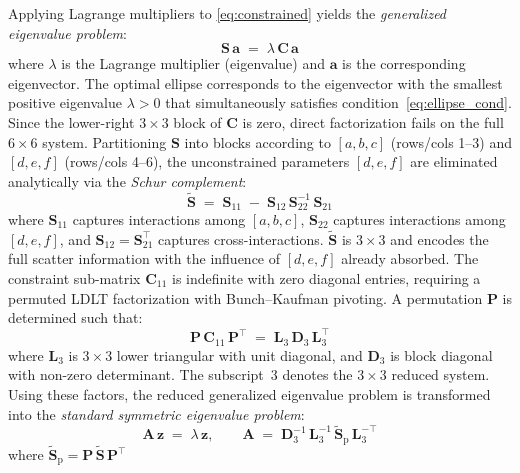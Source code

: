 \documentclass[colorlinks,upint,subscriptcorrection,varvw,hyphenate,balance,greek,russian,vietnamese,german]{asmeconf} %
\begin{document}
Applying Lagrange multipliers to \eqref{eq:constrained} yields
the \emph{generalized eigenvalue problem}:
\begin{equation}
	\mathbf{S}\,\mathbf{a} \;=\;
	\lambda\,\mathbf{C}\,\mathbf{a}
	\label{eq:gen_eig}
\end{equation}
where $\lambda$ is the Lagrange multiplier (eigenvalue) and
$\mathbf{a}$ is the corresponding eigenvector.
The optimal ellipse corresponds to the eigenvector
with the smallest positive eigenvalue $\lambda > 0$
that simultaneously satisfies condition~\eqref{eq:ellipse_cond}.
Since the lower-right $3\times3$ block of $\mathbf{C}$ is zero,
direct factorization fails on the full $6\times6$ system.
Partitioning $\mathbf{S}$ into blocks according to
$[a,b,c]$ (rows/cols 1--3) and $[d,e,f]$ (rows/cols 4--6),
the unconstrained parameters $[d,e,f]$ are eliminated
analytically via the \emph{Schur complement}:
\begin{equation}
	\widetilde{\mathbf{S}} \;=\;
	\mathbf{S}_{11}
	\;-\;
	\mathbf{S}_{12}\,\mathbf{S}_{22}^{-1}\,\mathbf{S}_{21}
	\label{eq:schur}
\end{equation}
where $\mathbf{S}_{11}$ captures interactions among $[a,b,c]$,
$\mathbf{S}_{22}$ captures interactions among $[d,e,f]$,
and $\mathbf{S}_{12}=\mathbf{S}_{21}^\top$ captures cross-interactions.
$\widetilde{\mathbf{S}}$ is $3\times3$ and encodes the full
scatter information with the influence of $[d,e,f]$ already absorbed.
The constraint sub-matrix $\mathbf{C}_{11}$ is indefinite with
zero diagonal entries, requiring a permuted LDLT factorization
with Bunch--Kaufman pivoting. A permutation $\mathbf{P}$
is determined such that:
\begin{equation}
	\mathbf{P}\,\mathbf{C}_{11}\,\mathbf{P}^\top
	\;=\; \mathbf{L}_3\,\mathbf{D}_3\,\mathbf{L}_3^\top
	\label{eq:ldlt}
\end{equation}
where $\mathbf{L}_3$ is $3\times3$ lower triangular with unit diagonal,
and $\mathbf{D}_3$ is block diagonal with non-zero determinant.
The subscript~3 denotes the $3\times3$ reduced system.
Using these factors, the reduced generalized eigenvalue problem is
transformed into the \emph{standard symmetric eigenvalue problem}:
\begin{equation}
	\mathbf{A}\,\mathbf{z} \;=\; \lambda\,\mathbf{z},
	\qquad
	\mathbf{A} \;=\;
	\mathbf{D}_3^{-1}\,\mathbf{L}_3^{-1}\,
	\widetilde{\mathbf{S}}_{\mathrm{p}}\,
	\mathbf{L}_3^{-\top}
	\label{eq:standard_eig}
\end{equation}
where $\widetilde{\mathbf{S}}_{\mathrm{p}} =
\mathbf{P}\,\widetilde{\mathbf{S}}\,\mathbf{P}^\top$
\end{document}
